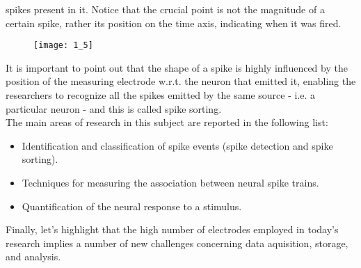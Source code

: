 spikes present in it. Notice that the crucial point is not the magnitude of a
certain spike, rather its position on the time axis, indicating when it was fired.
\begin{figure}[H]
    \texttt{[image: 1\_5]}
    \centering
\end{figure}
It is important to point out that the shape of a spike is highly influenced by the
position of the measuring electrode w.r.t. the neuron that emitted it, enabling
the researchers to recognize all the spikes emitted by the same source - i.e. a
particular neuron - and this is called spike sorting.\\
The main areas of research in this subject are reported in the following list:
\begin{itemize}
    \item Identification and classification of spike events (spike detection and
    spike sorting).
    \item Techniques for measuring the association between neural spike trains.
    \item Quantification of the neural response to a stimulus.
\end{itemize}
Finally, let's highlight that the high number of electrodes employed in today's
research implies a number of new challenges concerning data aquisition, storage,
and analysis.